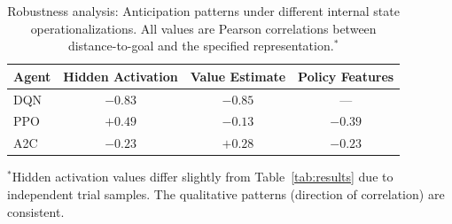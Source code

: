 \begin{table}[t]
\caption{Robustness analysis: Anticipation patterns under different internal state operationalizations. All values are Pearson correlations between distance-to-goal and the specified representation.$^*$}
\label{tab:robustness}
\centering
\small
\begin{tabular}{lccc}
\toprule
Agent & Hidden Activation & Value Estimate & Policy Features \\
\midrule
DQN & $-0.83$ & $-0.85$ & --- \\
PPO & $+0.49$ & $-0.13$ & $-0.39$ \\
A2C & $-0.23$ & $+0.28$ & $-0.23$ \\
\bottomrule
\end{tabular}
\vspace{1mm}

\raggedright
\footnotesize{$^*$Hidden activation values differ slightly from Table~\ref{tab:results} due to independent trial samples. The qualitative patterns (direction of correlation) are consistent.}
\end{table}
